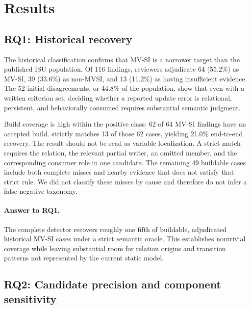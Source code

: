 
\section{Results}
\label{s:results}

\subsection{RQ1: Historical recovery}
\label{s:results-recovery}



The historical classification confirms that MV-SI is a narrower target than the published ISU population. Of 116 findings, reviewers adjudicate 64 (55.2\%) as MV-SI, 39 (33.6\%) as non-MVSI, and 13 (11.2\%) as having insufficient evidence. The 52 initial disagreements, or 44.8\% of the population, show that even with a written criterion set, deciding whether a reported update error is relational, persistent, and behaviorally consumed requires substantial semantic judgment.

Build coverage is high within the positive class: 62 of 64 MV-SI findings have an accepted build. \sys strictly matches 13 of those 62 cases, yielding 21.0\% end-to-end recovery. The result should not be read as variable localization. A strict match requires the relation, the relevant partial writer, an omitted member, and the corresponding consumer role in one candidate. The remaining 49 buildable cases include both complete misses and nearby evidence that does not satisfy that strict rule. We did not classify these misses by cause and therefore do not infer a false-negative taxonomy.

\paragraph{Answer to RQ1.}
The complete detector recovers roughly one fifth of buildable, adjudicated historical MV-SI cases under a strict semantic oracle. This establishes nontrivial coverage while leaving substantial room for relation origins and transition patterns not represented by the current static model.

\subsection{RQ2: Candidate precision and component sensitivity}
\label{s:results-precision}

